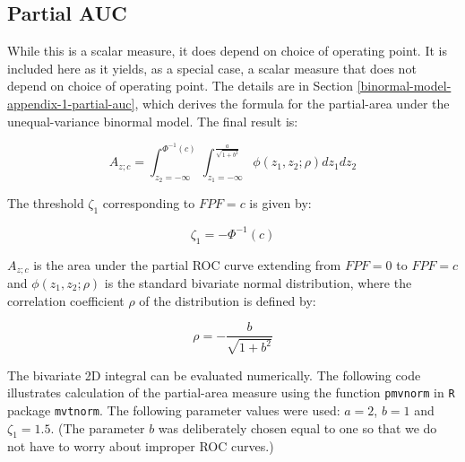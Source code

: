 \documentclass[
]{book}
\begin{document}
\hypertarget{binormal-model-partial-auc}{%
\subsection{Partial AUC}\label{binormal-model-partial-auc}}

While this is a scalar measure, it does depend on choice of operating point. It is included here as it yields, as a special case, a scalar measure that does not depend on choice of operating point. The details are in Section \ref{binormal-model-appendix-1-partial-auc}, which derives the formula for the partial-area under the unequal-variance binormal model. The final result is:

\begin{equation}
A_{z;c} = \int_{z_2=-\infty}^{\Phi^{-1}\left ( c \right )}   \int_{z_1=-\infty}^{\frac{a}{\sqrt{1+b^2}}} \phi\left ( z_1,z_2;\rho \right ) dz_1dz_2
\label{eq:binormal-model-partial-area-final}
\end{equation}

The threshold \(\zeta_1\) corresponding to \(FPF = c\) is given by:

\begin{equation} 
\zeta_1 = - \Phi^{-1}   \left ( c \right )
\label{eq:binormal-model-zeta-c-relation}
\end{equation}

\(A_{z;c}\) is the area under the partial ROC curve extending from \(FPF = 0\) to \(FPF = c\) and \(\phi\left ( z_1,z_2;\rho \right )\) is the standard bivariate normal distribution, where the correlation coefficient \(\rho\) of the distribution is defined by:

\begin{equation}
\rho = - \frac{b}{\sqrt{1+b^2}}
\label{eq:binormal-model-rho-final}
\end{equation}

The bivariate 2D integral can be evaluated numerically. The following code illustrates calculation of the partial-area measure using the function \texttt{pmvnorm} in \texttt{R} package \texttt{mvtnorm}. The following parameter values were used: \(a = 2\), \(b = 1\) and \(\zeta_1 = 1.5\). (The parameter \(b\) was deliberately chosen equal to one so that we do not have to worry about improper ROC curves.)
\end{document}
